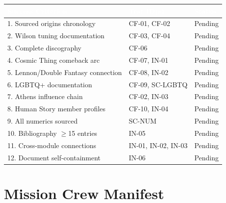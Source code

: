 \documentclass[11pt,letterpaper]{article}
\newcommand{\tableheader}[1]{\textbf{\sffamily\textcolor{white}{#1}}}
\begin{document}
\begin{center}
\begin{tabularx}{\textwidth}{XL{3.5cm}C{1.5cm}}
\toprule
{}
\tableheader{Success Criterion} & \tableheader{Test ID(s)} & \tableheader{Status} \\
. Sourced origins chronology & CF-01, CF-02 & Pending \\
2. Wilson tuning documentation & CF-03, CF-04 & Pending \\
3. Complete discography & CF-06 & Pending \\
4. Cosmic Thing comeback arc & CF-07, IN-01 & Pending \\
5. Lennon/Double Fantasy connection & CF-08, IN-02 & Pending \\
6. LGBTQ+ documentation & CF-09, SC-LGBTQ & Pending \\
7. Athens influence chain & CF-02, IN-03 & Pending \\
8. Human Story member profiles & CF-10, IN-04 & Pending \\
9. All numerics sourced & SC-NUM & Pending \\
10. Bibliography $\geq$15 entries & IN-05 & Pending \\
11. Cross-module connections & IN-01, IN-02, IN-03 & Pending \\
12. Document self-containment & IN-06 & Pending \\
\bottomrule
\end{tabularx}
\end{center}

\section{Mission Crew Manifest}
\end{document}

